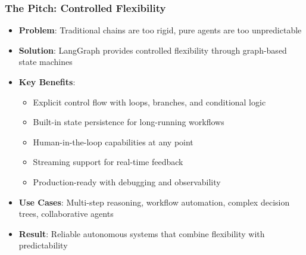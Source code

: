 \begin{frame}[fragile]\frametitle{The Pitch: Controlled Flexibility}
      \begin{itemize}
        \item \textbf{Problem}: Traditional chains are too rigid, pure agents are too unpredictable
        \item \textbf{Solution}: LangGraph provides controlled flexibility through graph-based state machines
        \item \textbf{Key Benefits}:
        \begin{itemize}
            \item Explicit control flow with loops, branches, and conditional logic
            \item Built-in state persistence for long-running workflows
            \item Human-in-the-loop capabilities at any point
            \item Streaming support for real-time feedback
            \item Production-ready with debugging and observability
        \end{itemize}
        \item \textbf{Use Cases}: Multi-step reasoning, workflow automation, complex decision trees, collaborative agents
        \item \textbf{Result}: Reliable autonomous systems that combine flexibility with predictability
      \end{itemize}
\end{frame}
